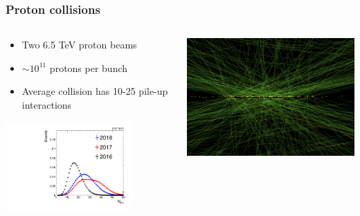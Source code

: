 \documentclass[aspectratio=169,xcolor=dvipsnames,,table,compress]{beamer}
\begin{document}
\begin{frame} \frametitle{Proton collisions}
  \vspace{-5mm}
  \begin{columns}
    \begin{column}{0.4\textwidth}
      \begin{itemize}
        \item Two 6.5 TeV proton beams
        \item $\sim 10^{11}$ protons per bunch
        \item Average collision has 10-25 pile-up interactions 
      \end{itemize}
      \centering 
      \includegraphics[width=0.75\textwidth]{../figures/cms/comparison_npv.pdf}
    \end{column}
    \begin{column}{0.6\textwidth}
      \includegraphics[width=\textwidth]{../figures/talk/vertices.png}
    \end{column}
  \end{columns}
\end{frame}
\end{document}
